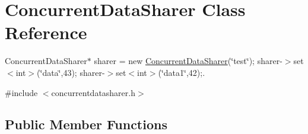 \hypertarget{classConcurrentDataSharer}{}\section{Concurrent\+Data\+Sharer Class Reference}
\label{classConcurrentDataSharer}


Concurrent\+Data\+Sharer$\ast$ sharer = new \hyperlink{classConcurrentDataSharer}{Concurrent\+Data\+Sharer}(\char`\"{}test\char`\"{}); sharer-\/$>$set$<$int$>$(\char`\"{}data\char`\"{},43); sharer-\/$>$set$<$int$>$(\char`\"{}data1\char`\"{},42);.  




{\ttfamily \#include $<$concurrentdatasharer.\+h$>$}

\subsection*{Public Member Functions}
